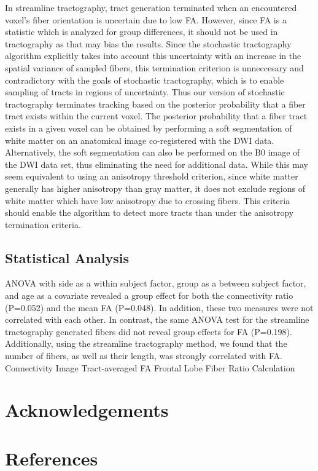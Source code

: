 \documentclass{article}
\begin{document}
In streamline tractography, tract generation terminated when an encountered voxel's fiber orientation is uncertain due to low FA.  However, since FA is a statistic which is analyzed for group differences, it should not be used in tractography as that may bias the results.  Since the stochastic tractography algorithm explicitly takes into account this uncertainty with an increase in the spatial variance of sampled fibers, this termination criterion is unneccesary and contradictory with the goals of stochastic tractography, which is to enable sampling of tracts in regions of uncertainty.  Thus our version of stochastic tractography terminates tracking based on the posterior probability that a fiber tract exists within the current voxel.  The posterior probability that a fiber tract exists in a given voxel can be obtained by performing a soft segmentation of white matter on an anatomical image co-registered with the DWI data.  Alternatively, the soft segmentation can also be performed on the B0 image of the DWI data set, thus eliminating the need for additional data.  While this may seem equivalent to using an anisotropy threshold criterion, since white matter generally has higher anisotropy than gray matter, it does not exclude regions of white matter which have low anisotropy due to crossing fibers.  This criteria should enable the algorithm to detect more tracts than under the anisotropy termination criteria.

\subsection{Statistical Analysis}
ANOVA with side as a within subject factor, group as a between subject factor, and age as a covariate revealed a group effect for both the connectivity ratio (P=0.052) and the mean FA (P=0.048). In addition, these two measures were not correlated with each other. In contrast, the same ANOVA test for the streamline tractography generated fibers did not reveal group effects for FA (P=0.198). Additionally, using the streamline tractography method, we found that the number of fibers, as well as their length, was strongly correlated with FA.
  Connectivity Image
  Tract-averaged FA
  Frontal Lobe Fiber Ratio Calculation

\section{Acknowledgements}
\section{References}

\end{document}
